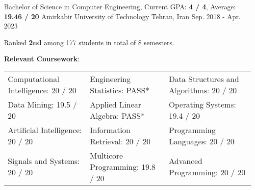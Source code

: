 

\begin{cventries}

  \cventry
    {Bachelor of Science in Computer Engineering, Current GPA: \textbf{4 / 4}, Average: \textbf{19.46 / 20}} %
    {Amirkabir University of Technology} %
    {Tehran, Iran} %
    {Sep. 2018 - Apr. 2023} %
    {
      \begin{cvitems}
        \item{Ranked \textbf{2nd} among 177 students in total of 8 semesters.}
        \item{
          \textbf{Relevant Coursework}:
          \smallskip
          \begin{adjustwidth}{4mm}{}
            \begin{tabular}{l@{\hskip 5mm}l@{\hskip 5mm}l}
              Computational Intelligence: 20 / 20 & Engineering Statistics: PASS*    & Data Structures and Algorithms: 20 / 20 \\
              Data Mining: 19.5 / 20              & Applied Linear Algebra: PASS*    & Operating Systems: 19.4 / 20            \\
              Artificial Intelligence: 20 / 20    & Information Retrieval: 20 / 20   & Programming Languages: 20 / 20          \\
              Signals and Systems: 20 / 20        & Multicore Programming: 19.8 / 20 & Advanced Programming: 20 / 20  

\end{tabular}
\end{adjustwidth}}
\end{cvitems}}
\end{cventries}
